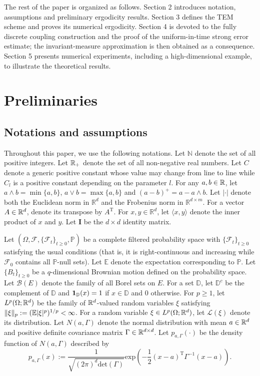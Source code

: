 \documentclass[aap]{imsart}
\theoremstyle{plain}
\theoremstyle{definition}
\begin{document}
The rest of the paper is organized as follows. Section 2 introduces notation, assumptions and preliminary ergodicity results. Section 3 defines the TEM scheme and proves its numerical ergodicity. Section 4 is devoted to the fully discrete coupling construction and the proof of the uniform-in-time strong error estimate; the invariant-measure approximation is then obtained as a consequence. Section 5 presents numerical experiments, including a high-dimensional example, to illustrate the theoretical results.
	
\section{Preliminaries}
\subsection{Notations and assumptions}
Throughout this paper, we use the following notations. Let $\mathbb{N}$ denote the set of all positive integers. Let $\mathbb{R}_+$ denote the set of all non-negative real numbers. 
Let $C$ denote a  generic positive constant whose value may change from line to line while $C_l$ is a positive constant depending on the parameter $l$. For any $a, b\in \mathbb{R}$, let $a\wedge b = \min\{a, b\}$, $a\vee b = \max\{a, b\}$ and \((a-b)^+ = a-a\wedge b\). Let $|\cdot|$ denote both the Euclidean norm in $\mathbb{R}^d$ and the Frobenius norm in $\mathbb{R}^{d \times m}$. 
For a vector $A\in\mathbb{R}^d$, denote its transpose by $A^\mathrm{T}$. For $x, y\in\mathbb{R}^d$, let $\langle x, y \rangle$ denote the inner product of $x$ and $y$. Let $\mathbf{I}$ be the $d\times d$ identity matrix. 
	
Let $(\Omega, \mathcal{F}, \{\mathcal{F}_t\}_{t\geqslant 0}, \mathbb{P})$ be a complete filtered probability space with $\{\mathcal{F}_t\}_{t\geqslant0}$ satisfying the usual conditions (that is, it is right-continuous and increasing while $\mathcal{F}_0$ contains all $\mathbb{P}$-null sets). Let $\mathbb{E}$ denote the expectation corresponding to $\mathbb{P}$.
Let $\{B_t\}_{t\geqslant 0}$ be a  $q$-dimensional Brownian motion defined on the probability space. Let $\mathcal{B}(E)$ denote the family of all Borel sets on $E$. For a set $\mathbb{D}$, let $\mathbb{D}^c$ be the complement of $\mathbb{D}$ and ${\bf 1}_\mathbb{D}(x) = 1$ if $x\in\mathbb{D}$ and $0$ otherwise.  For $p\geqslant1$, let $L^p(\Omega;\mathbb{R}^d)$ be the family of \(\mathbb{R}^d\)-valued random variables $\xi$ satisfying $\|\xi\|_p:=(\mathbb{E}|\xi |^p)^{1/p}<\infty$. 
For a random variable $\xi\in L^p(\Omega;\mathbb{R}^d)$, let $\mathcal{L}(\xi)$ denote its distribution.
Let $N(a, \Gamma)$ denote the normal distribution with mean $a\in\mathbb{R}^d$ and positive definite covariance matrix $\Gamma\in \mathbb{R}^{d\times d}$. 
Let $p_{a,\Gamma}(\cdot)$ be the density function of $N(a,\Gamma)$ described by 
\begin{equation*}
p_{a,\Gamma}(x) := \frac{1}{\sqrt{(2\pi)^d\mathrm{det}(\Gamma)}}\mathrm{exp}\left(-\frac{1}{2}(x-a)^\mathrm{T}\Gamma^{-1}(x-a)\right).
\end{equation*} 
\end{document}
